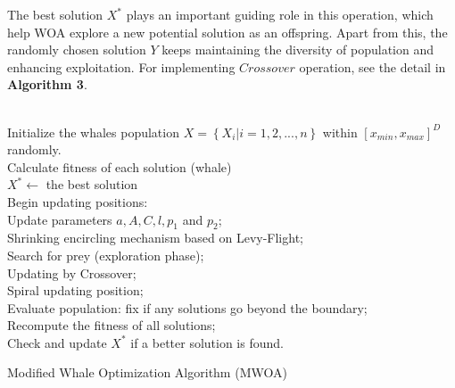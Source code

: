 \documentclass[a4paper]{article}
\begin{document}
The best solution $X^*$ plays an important guiding role in this operation, which help WOA explore a new potential solution as an offspring. Apart from this, the randomly chosen solution $Y$ keeps maintaining the diversity of population and enhancing exploitation. For implementing $Crossover$ operation, see the detail in \textbf{Algorithm 3}. \\ \\
\begin{algorithm}[H]
\SetAlgoLined
 Initialize the whales population $X = \left\{X_i| i = 1, 2, ..., n\right\}$ within $[x_{min}, x_{max}]^D$ randomly. \\
 Calculate fitness of each solution (whale) \\
 $X^*\gets$ the best solution \\
 {
 	Begin updating positions: \\
 	{
		Update parameters $a, A, C, l, p_1$ and $p_2$; \\ 	
		{
			{
				Shrinking encircling mechanism based on Levy-Flight;\\
			}
			{	
				Search for prey (exploration phase);\\
			 
			}
		}
		{
			{
				Updating by Crossover; \\
			}
			{
				Spiral updating position; \\
			}
		} 	
 	}
 	Evaluate population: fix if any solutions go beyond the boundary;\\
 	Recompute the fitness of all solutions;\\
 	Check and update $X^*$ if a better solution is found. \\
}
 	
 \caption{Modified Whale Optimization Algorithm (MWOA)}
\end{algorithm}
\end{document}
